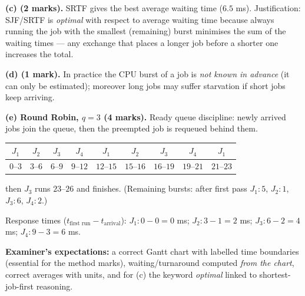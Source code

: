 \documentclass[11pt]{article}
\newcommand{\cle}[1]{{\popxbold\color{popdark}#1}}
\begin{document}
\begin{corrige}
\textbf{(c) (2 marks).} SRTF gives the best average waiting time ($6.5$ ms). Justification: SJF/SRTF is \emph{optimal} with respect to average waiting time because always running the job with the smallest (remaining) burst minimises the sum of the waiting times — any exchange that places a longer job before a shorter one increases the total.

\textbf{(d) (1 mark).} In practice the CPU burst of a job is \emph{not known in advance} (it can only be estimated); moreover long jobs may suffer \cle{starvation} if short jobs keep arriving.

\textbf{(e) Round Robin, $q=3$ (4 marks).} Ready queue discipline: newly arrived jobs join the queue, then the preempted job is requeued behind them.
\begin{center}
\begin{tabular}{|c|c|c|c|c|c|c|c|c|}
\hline
\rowcolor{popblueL} $J_1$ & $J_2$ & $J_3$ & $J_4$ & $J_1$ & $J_2$ & $J_3$ & $J_4$ & $J_1$ \\
\hline
$0$--$3$ & $3$--$6$ & $6$--$9$ & $9$--$12$ & $12$--$15$ & $15$--$16$ & $16$--$19$ & $19$--$21$ & $21$--$23$ \\
\hline
\end{tabular}
\end{center}
then $J_3$ runs $23$--$26$ and finishes. (Remaining bursts: after first pass $J_1\!:5$, $J_2\!:1$, $J_3\!:6$, $J_4\!:2$.)

Response times ($t_{\text{first run}} - t_{\text{arrival}}$): $J_1\!: 0-0 = 0$ ms; $J_2\!: 3-1 = 2$ ms; $J_3\!: 6-2 = 4$ ms; $J_4\!: 9-3 = 6$ ms.

\textbf{Examiner's expectations:} a correct Gantt chart with labelled time boundaries (essential for the method marks), waiting/turnaround computed \emph{from the chart}, correct averages with units, and for (c) the keyword \emph{optimal} linked to shortest-job-first reasoning.
\end{corrige}
\end{document}
